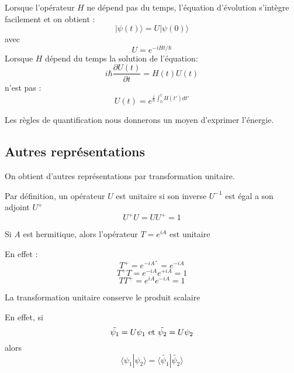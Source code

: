 \documentclass[12pt]{book}
\begin{document}
\begin{rem}
Lorsque l'op\'erateur $H$ ne d\'epend pas du temps, l'\'equation
d'\'evolution s'int\`egre facilement et on obtient :
\begin{equation}
|\psi(t)\rangle=U|\psi(0)\rangle
\end{equation}
avec 
\begin{equation}
U=e^{-iHt/\hbar}
\end{equation}
Lorsque $H$ d\'epend du temps la solution de l'\'equation:
\begin{equation}
i\hbar \frac{\partial U(t)}{\partial t}=H(t)U(t)
\end{equation}
n'est pas :
\begin{equation}
U(t)=e^{\frac{i}{\hbar}\int_0^t H(t')dt'}
\end{equation}
\end{rem}
Les r\`egles de quantification nous donnerons un moyen d'exprimer
l'\'energie.
\subsection{Autres repr\'esentations}\label{secautresrep}
On obtient d'autres repr\'esentations par transformation unitaire.
\begin{defn}
 Par d\'efinition\cite{ph:mecaq:Cohen73}, un op\'erateur $U$ est unitaire si son inverse
$U^{-1}$ est \'egal a son adjoint $U^+$
\begin{equation}
U^+U=UU^+=1
\end{equation}
\end{defn}
\begin{prop}
 Si $A$ est hermitique,  alors l'op\'erateur $T=e^{iA}$ est
unitaire
\end{prop}
En effet :
\begin{equation}
T^+=e^{-iA^+}=e^{-iA}
\end{equation}
\begin{equation}
T^+T=e^{-iA}e^{+iA}=1
\end{equation}
\begin{equation}
TT^+=e^{iA}e^{-iA}=1
\end{equation}
\begin{prop}
La transformation unitaire conserve le produit
scalaire
\end{prop}
\begin{pf} En effet, si 
\begin{equation}
\tilde{\psi_1}=U\psi_1 {\rm\ et\ } \tilde{\psi_2}=U\psi_2
\end{equation}
alors
\begin{equation}
 \langle \psi_1|\psi_2\rangle = \langle \tilde{\psi_1}|\tilde{\psi_2}\rangle 
\end{equation} 
\end{pf}
\end{document}
